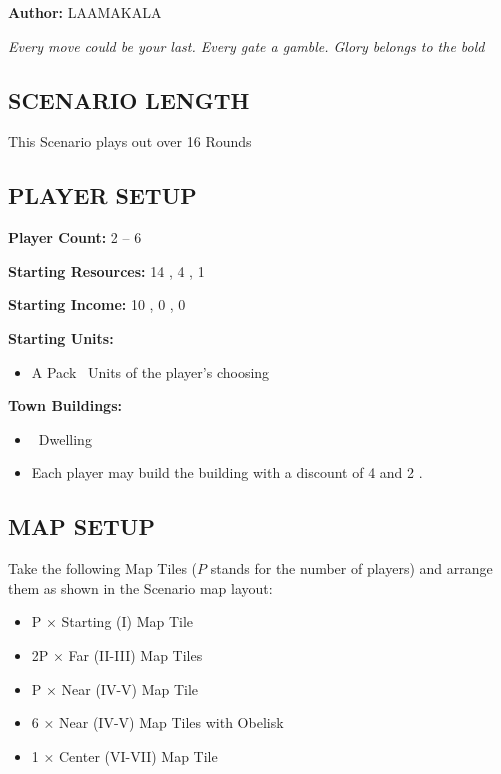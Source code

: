 
\begin{multicols*}{2}

\textbf{Author:} LAAMAKALA

\textit{Every move could be your last. Every gate a gamble. Glory belongs to the bold}

\subsection*{\MakeUppercase{Scenario Length}}
This Scenario plays out over 16 Rounds

\subsection*{\MakeUppercase{Player Setup}}
\textbf{Player Count:} 2 -- 6

\textbf{Starting Resources:} 14 , 4 , 1 

\textbf{Starting Income:} 10 , 0 , 0 

\textbf{Starting Units:}

\begin{itemize}
  \item A Pack \bronze\ Units of the player's choosing
\end{itemize}

\textbf{Town Buildings:}
\begin{itemize}
  \item \bronze\ Dwelling
  \item Each player may build the  building with a discount of 4  and 2 .
\end{itemize}

\subsection*{\MakeUppercase{Map Setup}}
Take the following Map Tiles ($P$ stands for the number of players) and arrange them as shown in the Scenario map layout:

\begin{itemize}
  \item P × Starting (I) Map Tile
  \item 2P × Far (II-III) Map Tiles
  \item P × Near (IV-V) Map Tile
  \item 6 × Near (IV-V) Map Tiles with Obelisk
  \item 1 × Center (VI-VII) Map Tile
\end{itemize}


\end{multicols*}
